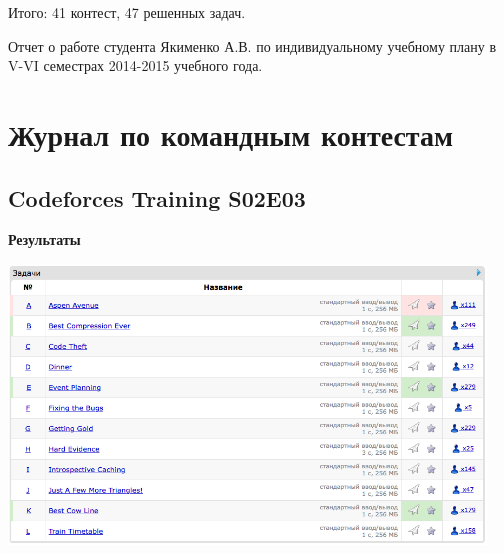 \documentclass[a4paper,12pt]{article}
\begin{document}
Итого: 41 контест, 47 решенных задач.
\newpage


Отчет о работе студента Якименко А.В. по индивидуальному учебному плану в V-VI семестрах 2014-2015 учебного года.



\newpage
\section{Журнал по командным контестам}

%
%
\subsection{Codeforces Training S02E03}

\textbf{{\large Результаты}} \\
\begin{center}
\includegraphics[width=0.95\textwidth]{CT_S02E03/CT_S02E03_result.png}\\ [1cm]
\end{center}
\end{document}
